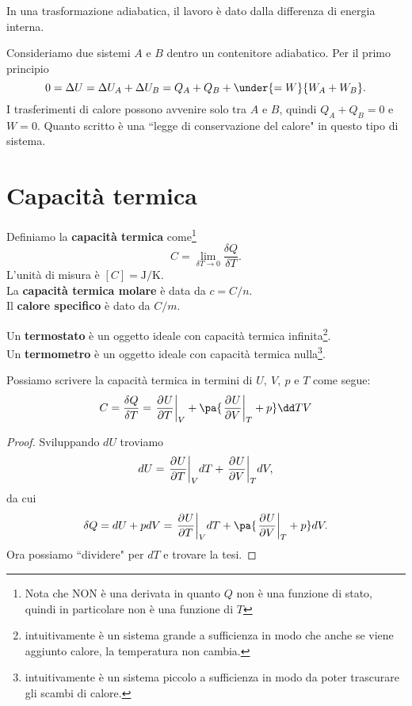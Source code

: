 \begin{remark}
In una trasformazione adiabatica, il lavoro \`e dato dalla differenza di energia interna.
\end{remark}
\begin{example}
Consideriamo due sistemi $A$ e $B$ dentro un contenitore adiabatico. Per il primo principio
\[0=\Delta U=\Delta U_A+\Delta U_B=Q_A+Q_B+\under{=W}{W_A+W_B}.\]
I trasferimenti di calore possono avvenire solo tra $A$ e $B$, quindi $Q_A+Q_B=0$ e $W=0$. Quanto scritto \`e una ``legge di conservazione del calore" in questo tipo di sistema.
\end{example}



\section{Capacit\`a termica}
\begin{definition}
Definiamo la \textbf{capacit\`a termica} come\footnote{Nota che NON \`e una derivata in quanto $Q$ non \`e una funzione di stato, quindi in particolare non \`e una funzione di $T$}
\[C=\lim_{\delta T\to 0}\frac{\delta Q}{\delta T}.\]
L'unit\`a di misura \`e $[C]=\mathrm{J}/\mathrm{K}$.\\
La \textbf{capacit\`a termica molare} \`e data da $c=C/n$.\\
Il \textbf{calore specifico} \`e dato da $C/m$.
\end{definition}

\begin{definition}
Un \textbf{termostato} \`e un oggetto ideale con capacit\`a termica infinita\footnote{intuitivamente \`e un sistema grande a sufficienza in modo che anche se viene aggiunto calore, la temperatura non cambia.}.\\ 
Un \textbf{termometro} \`e un oggetto ideale con capacit\`a termica nulla\footnote{intuitivamente \`e un sistema piccolo a sufficienza in modo da poter trascurare gli scambi di calore.}.
\end{definition}

\begin{remark}
Possiamo scrivere la capacit\`a termica in termini di $U,\ V,\ p$ e $T$ come segue:
\[C=\frac{\delta Q}{\delta T}=\ppb TUV+\pa{\ppb VUT+p}\dd TV\]
\end{remark}
\begin{proof}
Sviluppando $dU$ troviamo
\[dU=\ppb TUVdT+\ppb VUTdV,\]
da cui
\[\delta Q=dU+pdV=\ppb TUVdT+\pa{\ppb VUT+p}dV.\]
Ora possiamo ``dividere" per $dT$ e trovare la tesi.
\end{proof}

